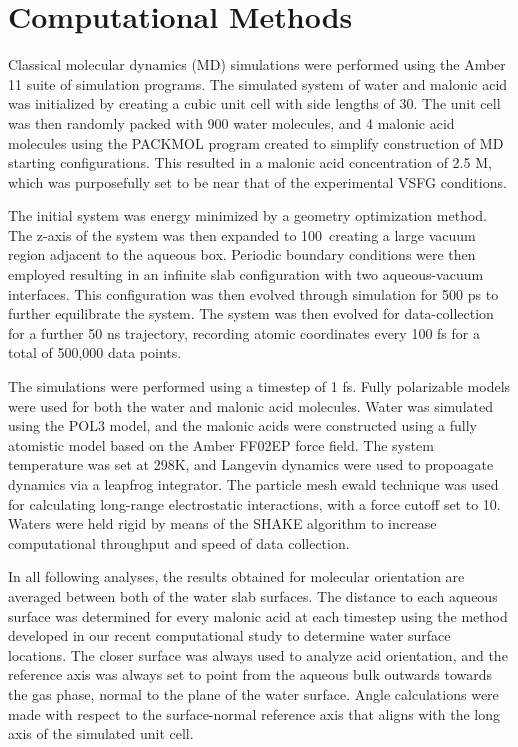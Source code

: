 \section {Computational Methods}

Classical molecular dynamics (MD) simulations were performed using the Amber 11 suite of simulation programs.\cite{Case2010,Pearlman1995} The simulated system of water and malonic acid was initialized by creating a cubic unit cell with side lengths of 30\angs. The unit cell was then randomly packed with 900 water molecules, and 4 malonic acid molecules using the PACKMOL program created to simplify construction of MD starting configurations.\cite{Martinez2009} This resulted in a malonic acid concentration of 2.5 M, which was purposefully set to be near that of the experimental VSFG conditions.

The initial system was energy minimized by a geometry optimization method. The z-axis of the system was then expanded to 100\angs~creating a large vacuum region adjacent to the aqueous box. Periodic boundary conditions were then employed resulting in an infinite slab configuration with two aqueous-vacuum interfaces. This configuration was then evolved through simulation for 500 ps to further equilibrate the system. The system was then evolved for data-collection for a further 50 ns trajectory, recording atomic coordinates every 100 fs for a total of 500,000 data points.

The simulations were performed using a timestep of 1 fs. Fully polarizable models were used for both the water and malonic acid molecules. Water was simulated using the POL3 model,\cite{Caldwell1995} and the malonic acids were constructed using a fully atomistic model based on the Amber FF02EP force field.\cite{Case2005} The system temperature was set at 298K, and Langevin dynamics were used to propoagate dynamics via a leapfrog integrator. The particle mesh ewald technique was used for calculating long-range electrostatic interactions, with a force cutoff set to 10\angs. Waters were held rigid by means of the SHAKE algorithm to increase computational throughput and speed of data collection.

In all following analyses, the results obtained for molecular orientation are averaged between both of the water slab surfaces. The distance to each aqueous surface was determined for every malonic acid at each timestep using the method developed in our recent computational study to determine water surface locations.\cite{Shamay2011} The closer surface was always used to analyze acid orientation, and the reference axis was always set to point from the aqueous bulk outwards towards the gas phase, normal to the plane of the water surface. Angle calculations were made with respect to the surface-normal reference axis that aligns with the long axis of the simulated unit cell.
